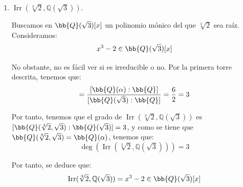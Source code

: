 \documentclass[12pt]{article}
\DeclareMathOperator{\Irr}{Irr}
\begin{document}
\begin{ejercicio}
\begin{enumerate}
        Por tanto, se deduce que:
        \begin{equation*}
            \Irr(\alpha,\mathbb{Q}(\sqrt{3})) = x^3+(9-3\sqrt{3})x-2-3\sqrt{3}\in \bb{Q}(\sqrt{3})[x]
        \end{equation*}


        \item $\Irr(\sqrt[3]{2},\mathbb{Q}(\sqrt{3}))$.
        
        Buscamos en $\bb{Q}(\sqrt{3})[x]$ un polinomio mónico del que $\sqrt[3]{2}$ sea raíz. Consideramos:
        \begin{equation*}
            x^3-2\in \bb{Q}(\sqrt{3})[x]
        \end{equation*}

        No obstante, no es fácil ver si es irreducible o no.        
        Por la primera torre descrita, tenemos que:
        \begin{equation*}
            [\bb{Q}(\alpha):\bb{Q}(\sqrt{3})] = \dfrac{[\bb{Q}(\alpha):\bb{Q}]}{[\bb{Q}(\sqrt{3}):\bb{Q}]} = \dfrac{6}{2} = 3
        \end{equation*}

        Por tanto, tenemos que el grado de $\Irr(\sqrt[3]{2},\mathbb{Q}(\sqrt{3}))$ es $[\bb{Q}(\sqrt[3]{2},\sqrt{3}):\bb{Q}(\sqrt{3})] = 3$, y como se tiene que $\bb{Q}(\sqrt[3]{2},\sqrt{3})=\bb{Q}(\alpha)$, tenemos que:
        \begin{equation*}
            \deg(\Irr(\sqrt[3]{2},\mathbb{Q}(\sqrt{3}))) = 3
        \end{equation*}

        Por tanto, se deduce que:
        \begin{equation*}
            \Irr(\sqrt[3]{2},\mathbb{Q}(\sqrt{3})) = x^3-2\in \bb{Q}(\sqrt{3})[x]
        \end{equation*}
    \end{enumerate}
\end{ejercicio}
\end{document}
